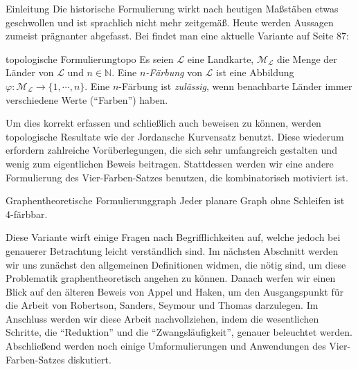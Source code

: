 \begin{chapter}{Einleitung}
 Die historische Formulierung wirkt nach heutigen Maßstäben etwas geschwollen und ist sprachlich nicht mehr zeitgemäß. Heute werden Aussagen zumeist prägnanter abgefasst. Bei \cite{fritsch} findet man eine aktuelle Variante auf Seite 87:  
 
 \begin{satzl}{topologische Formulierung}{topo}
  Es seien $\mathcal{L}$ eine Landkarte, $\mathcal{M}_\mathcal{L}$ die Menge der Länder von $\mathcal{L}$ und $n \in \mathbb{N}$. Eine \textit{$n$-Färbung} von $\mathcal{L}$ ist eine Abbildung $\varphi: \mathcal{M}_{\mathcal{L}} \rightarrow \{1,\cdots,n\}$. Eine $n$-Färbung ist \textit{zulässig}, wenn benachbarte Länder immer verschiedene Werte (``Farben'') haben.
 \end{satzl}

 Um dies korrekt erfassen und schließlich auch beweisen zu können, werden topologische Resultate wie der Jordansche Kurvensatz benutzt. Diese wiederum erfordern zahlreiche Vorüberlegungen, die sich sehr umfangreich gestalten und wenig zum eigentlichen Beweis beitragen. Stattdessen werden wir eine andere Formulierung des Vier-Farben-Satzes benutzen, die kombinatorisch motiviert ist. 
 
 \begin{satzl}{Graphentheoretische Formulierung}{graph}
  Jeder planare Graph ohne Schleifen ist 4-färbbar.
 \end{satzl}
 
 Diese Variante wirft einige Fragen nach Begrifflichkeiten auf, welche jedoch bei genauerer Betrachtung leicht verständlich sind. Im nächsten Abschnitt werden wir uns zunächst den allgemeinen Definitionen widmen, die nötig sind, um diese Problematik graphentheoretisch angehen zu können. Danach werfen wir einen Blick auf den älteren Beweis von Appel und Haken, um den Ausgangspunkt für die Arbeit von Robertson, Sanders, Seymour und Thomas darzulegen. Im Anschluss werden wir diese Arbeit nachvollziehen, indem die wesentlichen Schritte, die ``Reduktion'' und die ``Zwangsläufigkeit'', genauer beleuchtet werden. Abschließend werden noch einige Umformulierungen und Anwendungen des Vier-Farben-Satzes diskutiert.
\end{chapter}